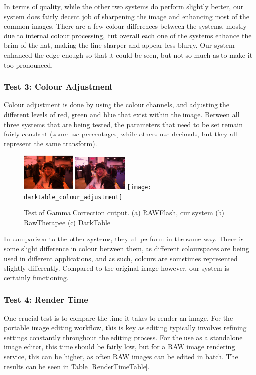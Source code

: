 \documentclass[10pt,a4paper]{article}
\begin{document}
In terms of quality, while the other two systems do perform slightly better, our system does fairly decent job of sharpening
the image and enhancing most of the common images. There are a few colour differences between the systems, mostly due to internal
colour processing, but overall each one of the systems enhance the brim of the hat, making the line sharper and appear less blurry. 
Our system enhanced the edge enough so that it could be seen, but not so much as to make it too pronounced.

\subsubsection{Test 3: Colour Adjustment}
Colour adjustment is done by using the colour channels, and adjusting the different levels of red, green and blue that exist within the image.
Between all three systems that are being tested, the parameters that need to be set remain fairly constant (some use percentages, while others use decimals,
but they all represent the same transform).

\begin{figure}\label{colouradjustmentcomparison}
    \centering
    \subfigure
    {
        \includegraphics[width=100px]{rawflash_colour_adjustment}
    }
    \subfigure
    {
        \includegraphics[width=100px]{rawtherapee_colour_adjustment}
    }
    \subfigure
    {
        \texttt{[image: darktable\_colour\_adjustment]}
    }
    \caption{
        Test of Gamma Correction output. 
        (a) RAWFlash, our system
        (b) RawTherapee
        (c) DarkTable
    }
 \end{figure}
In comparison to the other systems, they all perform in the same way. There is some slight difference in colour between them, as different colourspaces
are being used in different applications, and as such, colours are sometimes represented slightly differently. Compared to the original image however, our
system is certainly functioning.

\subsubsection{Test 4: Render Time}
One crucial test is to compare the time it takes to render an image. For the portable image editing workflow, this is key as editing typically involves
refining settings constantly throughout the editing process. For the use as a standalone image editor, this time should be fairly low, but for a RAW
image rendering service, this can be higher, as often RAW images can be edited in batch. The results can be seen in Table \ref{RenderTimeTable}.
\end{document}
